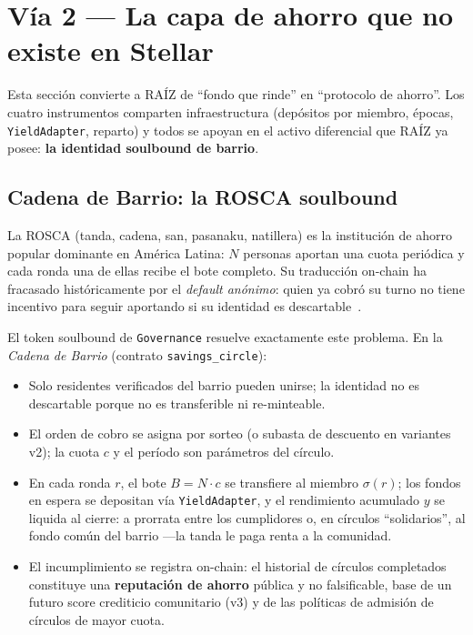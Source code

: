 \documentclass[twocolumn,10pt]{article}
\begin{document}
\section{V\'ia 2 --- La capa de ahorro que no existe en Stellar}
\label{sec:via2}

Esta secci\'on convierte a RA\'IZ de ``fondo que rinde'' en ``protocolo de ahorro''. Los cuatro instrumentos comparten infraestructura (dep\'ositos por miembro, \'epocas, \texttt{YieldAdapter}, reparto) y todos se apoyan en el activo diferencial que RA\'IZ ya posee: \textbf{la identidad soulbound de barrio}.

\subsection{Cadena de Barrio: la ROSCA soulbound}
\label{sec:cadena}

La ROSCA (tanda, cadena, san, pasanaku, natillera) es la instituci\'on de ahorro popular dominante en Am\'erica Latina: $N$ personas aportan una cuota peri\'odica y cada ronda una de ellas recibe el bote completo. Su traducci\'on on-chain ha fracasado hist\'oricamente por el \emph{default an\'onimo}: quien ya cobr\'o su turno no tiene incentivo para seguir aportando si su identidad es descartable~\cite{roscawiki,wetrust}.

El token soulbound de \texttt{Governance} resuelve exactamente este problema. En la \emph{Cadena de Barrio} (contrato \texttt{savings\_circle}):

\begin{itemize}
\item Solo residentes verificados del barrio pueden unirse; la identidad no es descartable porque no es transferible ni re-minteable.
\item El orden de cobro se asigna por sorteo (o subasta de descuento en variantes v2); la cuota $c$ y el per\'iodo son par\'ametros del c\'irculo.
\item En cada ronda $r$, el bote $B = N \cdot c$ se transfiere al miembro $\sigma(r)$; los fondos en espera se depositan v\'ia \texttt{YieldAdapter}, y el rendimiento acumulado $y$ se liquida al cierre: a prorrata entre los cumplidores o, en c\'irculos ``solidarios'', al fondo com\'un del barrio ---la tanda le paga renta a la comunidad.
\item El incumplimiento se registra on-chain: el historial de c\'irculos completados constituye una \textbf{reputaci\'on de ahorro} p\'ublica y no falsificable, base de un futuro score crediticio comunitario (v3) y de las pol\'iticas de admisi\'on de c\'irculos de mayor cuota.
\end{itemize}
\end{document}
